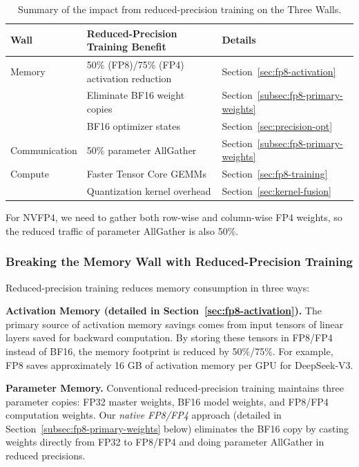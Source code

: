 \begin{table}[ht]
\centering
\begin{threeparttable}
\caption{Summary of the impact from reduced-precision training on the Three Walls.}
\label{tab:fp8-impact-summary}
\begin{tabular}{lll}
\toprule
\textbf{Wall} & \textbf{Reduced-Precision Training Benefit} & \textbf{Details} \\
\midrule
Memory & 50\% (FP8)/75\% (FP4) activation reduction & Section~\ref{sec:fp8-activation} \\
        & Eliminate BF16 weight copies & Section~\ref{subsec:fp8-primary-weights} \\
        & BF16 optimizer states & Section~\ref{sec:precision-opt} \\
\midrule
Communication & 50\% parameter AllGather \tnote{1} & Section~\ref{subsec:fp8-primary-weights} \\
\midrule
Compute & Faster Tensor Core GEMMs & Section~\ref{sec:fp8-training} \\
        & Quantization kernel overhead & Section~\ref{sec:kernel-fusion} \\
\bottomrule
\end{tabular}
\begin{tablenotes}
    \footnotesize
    \item[1] For NVFP4, we need to gather both row-wise and column-wise FP4 weights, so the reduced traffic of parameter AllGather is also 50\%.
\end{tablenotes}
\end{threeparttable}
\end{table}

\subsubsection{Breaking the Memory Wall with Reduced-Precision Training}

Reduced-precision training reduces memory consumption in three ways:

\textbf{Activation Memory (detailed in Section~\ref{sec:fp8-activation}).} The primary source of activation memory savings comes from input tensors of linear layers saved for backward computation. By storing these tensors in FP8/FP4 instead of BF16, the memory footprint is reduced by 50\%/75\%. For example, FP8 saves approximately 16 GB of activation memory per GPU for DeepSeek-V3.

\textbf{Parameter Memory.} Conventional reduced-precision training maintains three parameter copies: FP32 master weights, BF16 model weights, and FP8/FP4 computation weights. Our \emph{native FP8/FP4} approach (detailed in Section~\ref{subsec:fp8-primary-weights} below) eliminates the BF16 copy by casting weights directly from FP32 to FP8/FP4 and doing parameter AllGather in reduced precisions.

